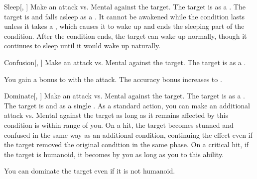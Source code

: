 \lowercase{\hypertarget{spell:Sleep}{}}\label{spell:Sleep}
\begin{freeability}[Rank 4]{\hypertarget{spell:Sleep}{Sleep}}[, ]
Make an attack vs. Mental against the target.
\hit The target is  as a .
\crit The target is  and falls asleep as a .
It cannot be awakened while the condition lasts unless it takes a , which causes it to wake up and ends the sleeping part of the condition.
After the condition ends, the target can wake up normally, though it continues to sleep until it would wake up naturally.
\end{freeability}
\vspace{0.25em}



\lowercase{\hypertarget{spell:Confusion}{}}\label{spell:Confusion}
\begin{freeability}[Rank 5]{\hypertarget{spell:Confusion}{Confusion}}[, ]
Make an attack vs. Mental against the target.
\hit The target is \confused as a .

\rankline
{} You gain a  bonus to  with the attack.
 The accuracy bonus increases to .
\end{freeability}
\vspace{0.25em}



\lowercase{\hypertarget{spell:Dominate}{}}\label{spell:Dominate}
\begin{freeability}[Rank 5]{\hypertarget{spell:Dominate}{Dominate}}[, ]
Make an attack vs. Mental against the target.
\hit The target is  as a .
\crit The target is  and  as a single .
As a standard action, you can make an additional attack vs. Mental against the target as long as it remains affected by this condition is within \rngmed range of you.
On a hit, the target becomes stunned and confused in the same way as an additional condition, continuing the effect even if the target removed the original condition in the same phase.
On a critical hit, if the target is humanoid, it becomes  by you as long as you  to this ability.

\rankline
{} You can dominate the target even if it is not humanoid.
\end{freeability}
\vspace{0.25em}



